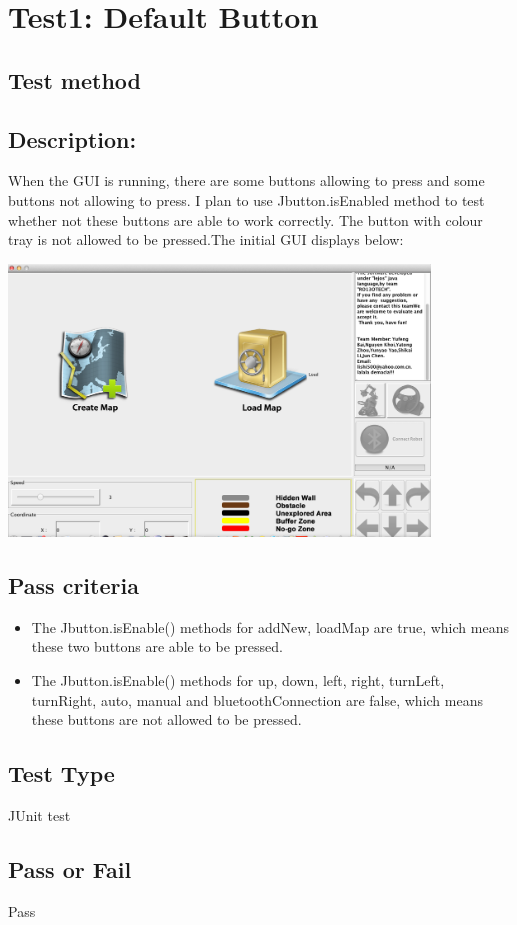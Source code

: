 \documentclass[11pt, a4paper]{report}
\begin{document}
\section{Test1: Default Button}
\subsection{Test method}
\subsection{Description:}
When the GUI is running, there are some buttons allowing to press and some buttons not allowing to press. I plan to use Jbutton.isEnabled method to test whether not these buttons are able to work correctly. The button with colour tray is not allowed to be pressed.The initial GUI displays below:
 \begin{center}
 \includegraphics[width=11.20cm]{defaultButton}
\end{center}
\subsection{Pass criteria}
\begin{itemize}
\item The Jbutton.isEnable() methods for addNew, loadMap are true, which means these two buttons are able to be pressed.
\item The Jbutton.isEnable() methods for up, down, left, right, turnLeft, turnRight, auto, manual and bluetoothConnection are false, which means these buttons are not allowed to be pressed.  
\end{itemize}
\subsection{Test Type}
JUnit test
\subsection{Pass or Fail}
Pass
\end{document}
